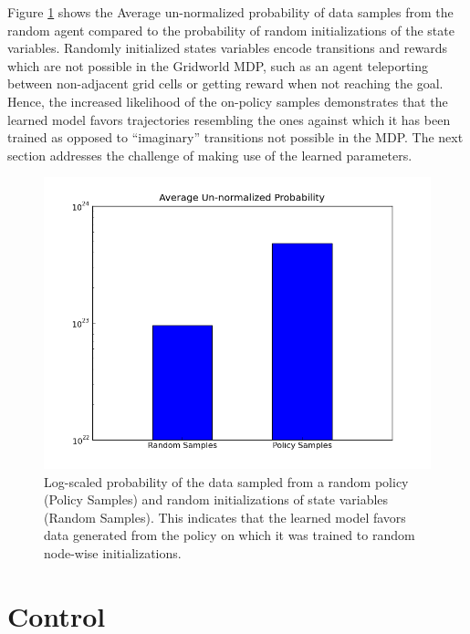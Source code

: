 \documentclass{article} %
\begin{document}
Figure \ref{fig:learning} shows the Average un-normalized probability of data samples from the random agent compared to the probability of random initializations of the state variables. Randomly initialized states variables encode transitions and rewards which are not possible in the Gridworld MDP, such as an agent teleporting between non-adjacent grid cells or getting reward when not reaching the goal. Hence, the increased likelihood of the on-policy samples demonstrates that the learned model favors trajectories resembling the ones against which it has been trained as opposed to ``imaginary'' transitions not possible in the MDP. The next section addresses the challenge of making use of the learned parameters.

\begin{figure}
  \centering
  \includegraphics[width=.7\textwidth]{figures/graph.png}
  \caption{Log-scaled probability of the data sampled from a random policy (Policy Samples) and random initializations of state variables (Random Samples). This indicates that the learned model favors data generated from the policy on which it was trained to random node-wise initializations.}
  \label{fig:learning}
\end{figure}



\section{Control}
\end{document}
